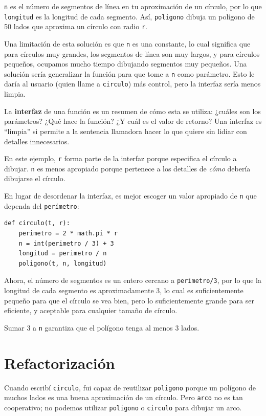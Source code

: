 \documentclass[10pt]{book}
\begin{document}
{\tt n} es el número de segmentos de línea en tu aproximación de un círculo,
por lo que {\tt longitud} es la longitud de cada segmento.  Así, {\tt poligono}
dibuja un polígono de 50 lados que aproxima un círculo con radio {\tt r}.

Una limitación de esta solución es que {\tt n} es una constante, lo cual
significa que para círculos muy grandes, los segmentos de línea son muy largos, y
para círculos pequeños, ocupamos mucho tiempo dibujando segmentos muy pequeños.  Una
solución sería generalizar la función para que tome a {\tt n} como
parámetro.  Esto le daría al usuario (quien llame a {\tt circulo})
más control, pero la interfaz sería menos limpia.

La {\bf interfaz} de una función es un resumen de cómo esta se utiliza: ¿cuáles
son los parámetros?  ¿Qué hace la función?  ¿Y cuál es el valor de
retorno?  Una interfaz es ``limpia'' si permite a la sentencia llamadora hacer
lo que quiere sin lidiar con detalles innecesarios.

En este ejemplo, {\tt r} forma parte de la interfaz porque
especifica el círculo a dibujar.  {\tt n} es menos apropiado
porque pertenece a los detalles de {\em cómo} debería dibujarse
el círculo.

En lugar de desordenar la interfaz, es mejor
escoger un valor apropiado de {\tt n}
que dependa del {\tt perímetro}:

\begin{verbatim}
def circulo(t, r):
    perimetro = 2 * math.pi * r
    n = int(perimetro / 3) + 3
    longitud = perimetro / n
    poligono(t, n, longitud)
\end{verbatim}
%
Ahora, el número de segmentos es un entero cercano a {\tt perimetro/3},
por lo que la longitud de cada segmento es aproximadamente 3, lo cual es suficientemente
pequeño para que el círculo se vea bien, pero lo suficientemente grande para ser eficiente,
y aceptable para cualquier tamaño de círculo.

Sumar 3 a {\tt n} garantiza que el polígono tenga al menos 3 lados.


\section{Refactorización}
\label{refactoring}

Cuando escribí {\tt circulo}, fui capaz de reutilizar {\tt poligono}
porque un polígono de muchos lados es una buena aproximación de un círculo.
Pero {\tt arco} no es tan cooperativo; no podemos utilizar {\tt poligono}
o {\tt circulo} para dibujar un arco.
\end{document}
